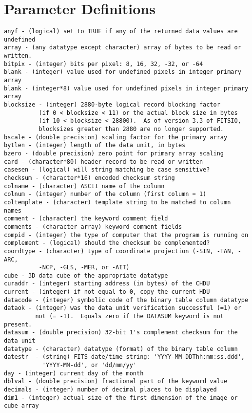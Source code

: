 \documentclass[11pt]{book}
\begin{document}
\chapter{ Parameter Definitions }

\begin{verbatim}
anyf - (logical) set to TRUE if any of the returned data values are undefined
array - (any datatype except character) array of bytes to be read or written.
bitpix - (integer) bits per pixel: 8, 16, 32, -32, or -64
blank - (integer) value used for undefined pixels in integer primary array
blank - (integer*8) value used for undefined pixels in integer primary array
blocksize - (integer) 2880-byte logical record blocking factor
          (if 0 < blocksize < 11) or the actual block size in bytes
          (if 10 < blocksize < 28800).  As of version 3.3 of FITSIO,
          blocksizes greater than 2880 are no longer supported.
bscale - (double precision) scaling factor for the primary array
bytlen - (integer) length of the data unit, in bytes
bzero - (double precision) zero point for primary array scaling
card - (character*80) header record to be read or written
casesen - (logical) will string matching be case sensitive?
checksum - (character*16) encoded checksum string
colname - (character) ASCII name of the column
colnum - (integer) number of the column (first column = 1)
coltemplate - (character) template string to be matched to column names
comment - (character) the keyword comment field
comments - (character array) keyword comment fields
compid - (integer) the type of computer that the program is running on
complement - (logical) should the checksum be complemented?
coordtype - (character) type of coordinate projection (-SIN, -TAN, -ARC,
          -NCP, -GLS, -MER, or -AIT)
cube - 3D data cube of the appropriate datatype
curaddr - (integer) starting address (in bytes) of the CHDU
current - (integer) if not equal to 0, copy the current HDU
datacode - (integer) symbolic code of the binary table column datatype
dataok - (integer) was the data unit verification successful (=1) or
         not (= -1).  Equals zero if the DATASUM keyword is not present.
datasum - (double precision) 32-bit 1's complement checksum for the data unit
datatype - (character) datatype (format) of the binary table column
datestr  - (string) FITS date/time string: 'YYYY-MM-DDThh:mm:ss.ddd',
           'YYYY-MM-dd', or 'dd/mm/yy'
day - (integer) current day of the month
dblval - (double precision) fractional part of the keyword value
decimals - (integer) number of decimal places to be displayed
dim1 - (integer) actual size of the first dimension of the image or cube array

\end{verbatim}
\end{document}
